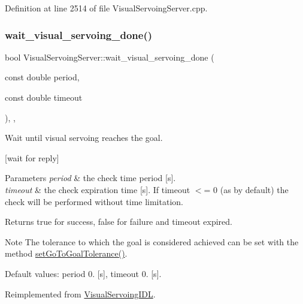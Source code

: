 Definition at line 2514 of file Visual\+Servoing\+Server.\+cpp.

\mbox{\label{classVisualServoingServer_afcd501bb1d5070e8a0735f422a4c9ac0}} 
\subsubsection{\texorpdfstring{wait\+\_\+visual\+\_\+servoing\+\_\+done()}{wait\_visual\_servoing\_done()}}
{\footnotesize\ttfamily bool Visual\+Servoing\+Server\+::wait\+\_\+visual\+\_\+servoing\+\_\+done (\begin{DoxyParamCaption}\item[{const double}]{period,  }\item[{const double}]{timeout }\end{DoxyParamCaption})\hspace{0.3cm}{\ttfamily [override]}, {\ttfamily [protected]}, {\ttfamily [virtual]}}



Wait until visual servoing reaches the goal. 

\mbox{[}wait for reply\mbox{]} 
\begin{DoxyParams}{Parameters}
{\em period} & the check time period \mbox{[}s\mbox{]}. \\
\hline
{\em timeout} & the check expiration time \mbox{[}s\mbox{]}. If timeout $<$= 0 (as by default) the check will be performed without time limitation. \\
\hline
\end{DoxyParams}
\begin{DoxyReturn}{Returns}
true for success, false for failure and timeout expired. 
\end{DoxyReturn}
\begin{DoxyNote}{Note}
The tolerance to which the goal is considered achieved can be set with the method \hyperlink{classVisualServoingServer_ad632db85663df2f8c7ca5c27eaacfd71}{set\+Go\+To\+Goal\+Tolerance()}. 

Default values\+: period 0. \mbox{[}s\mbox{]}, timeout 0. \mbox{[}s\mbox{]}. 
\end{DoxyNote}


Reimplemented from \hyperlink{classVisualServoingIDL_aa9c9a265e56b0f85c297d2b7d3c8d9c3}{Visual\+Servoing\+I\+DL}.



